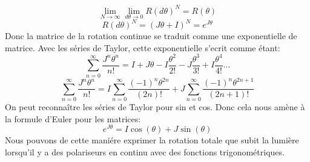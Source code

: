 \documentclass{article}
\begin{document}
$$ 
\lim_{N \to \infty} \lim_{d\theta \to 0} R(d\theta)^N = R(\theta)
$$
$$
R(d\theta)^N = (J\theta + I)^N = e^{J\theta}
$$
Donc la matrice de la rotation continue se traduit comme une exponentielle de matrice. Avec les séries de Taylor, cette exponentielle s'ecrit comme étant:
$$
\sum_{n = 0}^{\infty} \frac{J^n \theta^n}{n!} = I + J\theta - I \frac{\theta^2}{2!} - J \frac{\theta^3}{3!} + I \frac{\theta^4}{4!} ...
$$
$$
\sum_{n = 0}^{\infty} \frac{J^n \theta^n}{n!} = I \sum_{n = 0}^{\infty} \frac{(-1)^n \theta^{2n}}{(2n)!} + J \sum_{n = 0}^{\infty} \frac{(-1)^n \theta^{2n+1}}{(2n+1)!}
$$
On peut reconnaître les séries de Taylor pour sin et cos.
Donc cela nous amène à la formule d'Euler pour les matrices:
$$
e^{J\theta} = I \cos(\theta) + J \sin(\theta)
$$
Nous pouvons de cette maniére exprimer la rotation totale que subit la lumière lorsqu'il y a des polariseurs en continu avec des fonctions trigonométriques.
\end{document}
